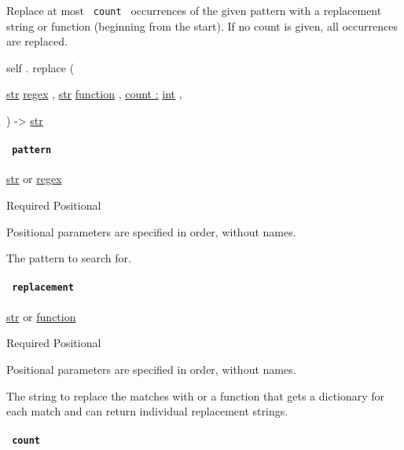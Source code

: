 Replace at most \texttt{\ count\ } occurrences of the given pattern with
a replacement string or function (beginning from the start). If no count
is given, all occurrences are replaced.

self { . } { replace } (

{ \href{/docs/reference/foundations/str/}{str}
\href{/docs/reference/foundations/regex/}{regex} , } {
\href{/docs/reference/foundations/str/}{str}
\href{/docs/reference/foundations/function/}{function} , } {
\hyperref[definitions-replace-parameters-count]{count :}
\href{/docs/reference/foundations/int/}{int} , }

) -\textgreater{} \href{/docs/reference/foundations/str/}{str}

\paragraph{\texorpdfstring{\texttt{\ pattern\ }}{ pattern }}\label{definitions-replace-pattern}

\href{/docs/reference/foundations/str/}{str} {or}
\href{/docs/reference/foundations/regex/}{regex}

{Required} {{ Positional }}

\label{definitions-replace-pattern-positional-tooltip}
Positional parameters are specified in order, without names.

The pattern to search for.

\paragraph{\texorpdfstring{\texttt{\ replacement\ }}{ replacement }}\label{definitions-replace-replacement}

\href{/docs/reference/foundations/str/}{str} {or}
\href{/docs/reference/foundations/function/}{function}

{Required} {{ Positional }}

\label{definitions-replace-replacement-positional-tooltip}
Positional parameters are specified in order, without names.

The string to replace the matches with or a function that gets a
dictionary for each match and can return individual replacement strings.

\paragraph{\texorpdfstring{\texttt{\ count\ }}{ count }}\label{definitions-replace-count}

